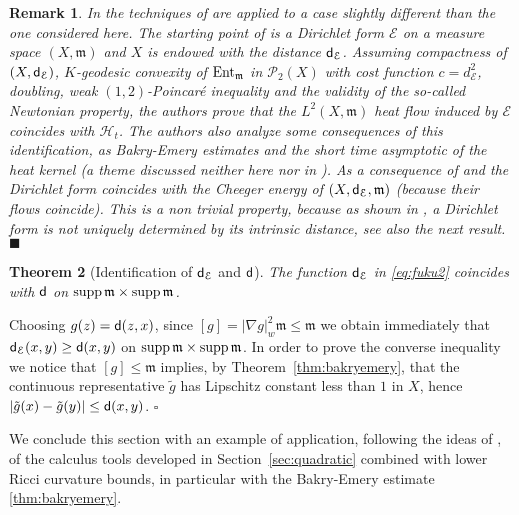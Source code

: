 \documentclass[reqno,11pt]{article}
\numberwithin{equation}{section}
\newcommand{\mm}{{\mbox{\boldmath$m$}}}
\newcommand{\sfd}{{\sf d}}
\newcommand{\supp}{\mathop{\rm supp}\nolimits}   %
\newcommand{\ProbabilitiesTwo}[1]{\mathscr P_2(#1)}     %
\newenvironment{proof}{\removelastskip\par\medskip   %
\noindent{\em Proof.}
\rm}{\penalty-20\null\hfill$\square$\par\medbreak}
\newtheorem{theorem}{Theorem}[section]
\newtheorem{remark}[theorem]{Remark}
\newcommand{\entv}{{\rm Ent}_{\mm}}                    %
\newcommand{\probt}{\ProbabilitiesTwo}
\newcommand{\fr}{\hfill$\blacksquare$}                      %
\newcommand{\weakgrad}[1]{|\nabla #1|_w}                %
\newcommand{\heatw}{{\mathscr H}}
\renewcommand{\mm}{\mathfrak m}
\begin{document}
\begin{remark}\label{rem:KoskelaZhou}{\rm
In \cite{Koskela-Zhou11} the techniques of
\cite{GigliKuwadaOhta10,Ambrosio-Gigli-Savare11} are applied to a
case slightly different than the one considered here. The starting
point of \cite{Koskela-Zhou11} is a Dirichlet form $\mathcal E$ on a
measure space $(X,\mm)$ and $X$ is endowed with the distance
$\sfd_{\mathcal E}$. Assuming compactness of $(X,\sfd_{\mathcal
E})$, $K$-geodesic convexity of $\entv$ in $\probt{X}$ with cost
function $c=d_{\mathcal E}^2$, doubling, weak $(1,2)$-Poincar\'e
inequality and the validity of the so-called Newtonian property, the
authors prove that the $L^2(X,\mm)$ heat flow induced by $\mathcal
E$ coincides with $\heatw_t$. The authors also analyze some
consequences of this identification, as Bakry-Emery estimates and
the short time asymptotic of the heat kernel (a theme discussed
neither here nor in \cite{GigliKuwadaOhta10}). As a consequence of
\cite[Theorem~5.1]{Koskela-Zhou11} and
\cite[Theorem~9.3]{Ambrosio-Gigli-Savare11} the Dirichlet form
coincides with the Cheeger energy of $(X,\sfd_{\mathcal E},\mm)$
(because their flows coincide). This is a non trivial property,
because as shown in \cite{Sturm97}, a Dirichlet form is not uniquely
determined by its intrinsic distance, see also the next
result.\fr}\end{remark}


\begin{theorem}[Identification of $\sfd_{{\mathcal E}}$ and $\sfd$]\label{thm:idistances}
The function $\sfd_{{\mathcal E}}$ in \eqref{eq:fuku2} coincides
with $\sfd$ on $\supp\mm\times\supp\mm$.
\end{theorem}
\begin{proof} Choosing $g(z)=\sfd(z,x)$, since $[g]=\weakgrad{g}^2\mm\leq\mm$
we obtain immediately that $\sfd_{{\mathcal E}}(x,y)\geq\sfd(x,y)$
on $\supp\mm\times\supp\mm$. In order to prove the converse
inequality we notice that $[g]\leq\mm$ implies, by
Theorem~\ref{thm:bakryemery}, that the continuous representative
$\tilde g$ has Lipschitz constant less than $1$ in $X$, hence
$|\tilde{g}(x)-\tilde{g}(y)|\leq\sfd(x,y)$.
\end{proof}

We conclude this section with an example of application, following
the ideas of \cite{Bakry06}, of the calculus tools developed in
Section~\ref{sec:quadratic} combined with lower Ricci curvature
bounds, in particular with the Bakry-Emery estimate
\eqref{thm:bakryemery}.
\end{document}
